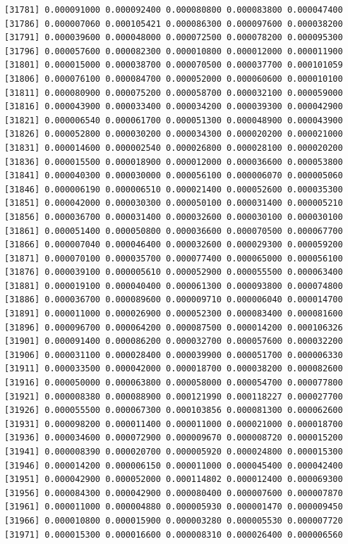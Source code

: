 \documentclass[]{article}
\begin{document}
\begin{verbatim}
[31781] 0.000091000 0.000092400 0.000080800 0.000083800 0.000047400
[31786] 0.000007060 0.000105421 0.000086300 0.000097600 0.000038200
[31791] 0.000039600 0.000048000 0.000072500 0.000078200 0.000095300
[31796] 0.000057600 0.000082300 0.000010800 0.000012000 0.000011900
[31801] 0.000015000 0.000038700 0.000070500 0.000037700 0.000101059
[31806] 0.000076100 0.000084700 0.000052000 0.000060600 0.000010100
[31811] 0.000080900 0.000075200 0.000058700 0.000032100 0.000059000
[31816] 0.000043900 0.000033400 0.000034200 0.000039300 0.000042900
[31821] 0.000006540 0.000061700 0.000051300 0.000048900 0.000043900
[31826] 0.000052800 0.000030200 0.000034300 0.000020200 0.000021000
[31831] 0.000014600 0.000002540 0.000026800 0.000028100 0.000020200
[31836] 0.000015500 0.000018900 0.000012000 0.000036600 0.000053800
[31841] 0.000040300 0.000030000 0.000056100 0.000006070 0.000005060
[31846] 0.000006190 0.000006510 0.000021400 0.000052600 0.000035300
[31851] 0.000042000 0.000030300 0.000050100 0.000031400 0.000005210
[31856] 0.000036700 0.000031400 0.000032600 0.000030100 0.000030100
[31861] 0.000051400 0.000050800 0.000036600 0.000070500 0.000067700
[31866] 0.000007040 0.000046400 0.000032600 0.000029300 0.000059200
[31871] 0.000070100 0.000035700 0.000077400 0.000065000 0.000056100
[31876] 0.000039100 0.000005610 0.000052900 0.000055500 0.000063400
[31881] 0.000019100 0.000040400 0.000061300 0.000093800 0.000074800
[31886] 0.000036700 0.000089600 0.000009710 0.000006040 0.000014700
[31891] 0.000011000 0.000026900 0.000052300 0.000083400 0.000081600
[31896] 0.000096700 0.000064200 0.000087500 0.000014200 0.000106326
[31901] 0.000091400 0.000086200 0.000032700 0.000057600 0.000032200
[31906] 0.000031100 0.000028400 0.000039900 0.000051700 0.000006330
[31911] 0.000033500 0.000042000 0.000018700 0.000038200 0.000082600
[31916] 0.000050000 0.000063800 0.000058000 0.000054700 0.000077800
[31921] 0.000008380 0.000088900 0.000121990 0.000118227 0.000027700
[31926] 0.000055500 0.000067300 0.000103856 0.000081300 0.000062600
[31931] 0.000098200 0.000011400 0.000011000 0.000021000 0.000018700
[31936] 0.000034600 0.000072900 0.000009670 0.000008720 0.000015200
[31941] 0.000008390 0.000020700 0.000005920 0.000024800 0.000015300
[31946] 0.000014200 0.000006150 0.000011000 0.000045400 0.000042400
[31951] 0.000042900 0.000052000 0.000114802 0.000012400 0.000069300
[31956] 0.000084300 0.000042900 0.000080400 0.000007600 0.000007870
[31961] 0.000011000 0.000004880 0.000005930 0.000001470 0.000009450
[31966] 0.000010800 0.000015900 0.000003280 0.000005530 0.000007720
[31971] 0.000015300 0.000016600 0.000008310 0.000026400 0.000006560

\end{verbatim}
\end{document}
